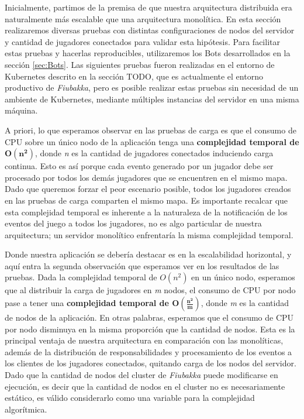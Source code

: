 
\noindent Inicialmente, partimos de la premisa de que nuestra arquitectura distribuida era naturalmente más escalable
que una arquitectura monolítica. En esta sección realizaremos diversas pruebas con distintas configuraciones de nodos del servidor y cantidad
de jugadores conectados para validar esta hipótesis. Para facilitar estas pruebas y hacerlas reproducibles, utilizaremos los Bots desarrollados
en la sección \ref{sec:Bots}. Las siguientes pruebas fueron realizadas en el entorno de Kubernetes descrito en la sección TODO, que es actualmente el entorno
productivo de \textit{Fiubakka}, pero es posible realizar estas pruebas sin necesidad de un ambiente de Kubernetes, mediante múltiples instancias del
servidor en una misma máquina.

A priori, lo que esperamos observar en las pruebas de carga es que el consumo de CPU sobre un único nodo de la aplicación tenga una \textbf{complejidad temporal
de $\boldsymbol{O(n^2)}$}, donde \textit{n} es la cantidad de jugadores conectados induciendo carga continua. Esto es así porque cada evento generado por un jugador debe ser procesado por todos los
demás jugadores que se encuentren en el mismo mapa. Dado que queremos forzar el peor escenario posible, todos los jugadores creados en las pruebas de carga comparten el mismo mapa.
Es importante recalcar que esta complejidad temporal es inherente a la naturaleza de la notificación de los eventos del juego a todos los jugadores, no es algo particular de nuestra arquitectura; un servidor monolítico
enfrentaría la misma complejidad temporal.

Donde nuestra aplicación se debería destacar es en la escalabilidad horizontal, y aquí entra la segunda observación que esperamos ver en los resultados de las pruebas. Dada la complejidad temporal de
$O(n^2)$ en un único nodo, esperamos que al distribuir la carga de jugadores en \textit{m} nodos, el consumo de CPU por nodo pase a tener una \textbf{complejidad temporal de $\boldsymbol{O(\frac{n^2}{m})}$}, donde \textit{m} es la cantidad de nodos
de la aplicación. En otras palabras, esperamos que el consumo de CPU por nodo disminuya en la misma proporción que la cantidad de nodos. Esta es la principal ventaja de nuestra arquitectura en comparación con las monolíticas,
además de la distribución de responsabilidades y procesamiento de los eventos a los clientes de los jugadores conectados, quitando carga de los nodos del servidor.
Dado que la cantidad de nodos del cluster de \textit{Fiubakka} puede modificarse en ejecución, es decir que la cantidad de nodos en el cluster no es necesariamente estático, es válido considerarlo como una variable para la complejidad
algorítmica.

